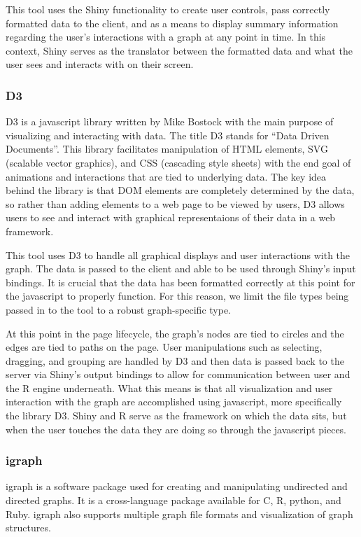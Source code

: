 \documentclass{article}\usepackage{graphicx, color}
\begin{document}
This tool uses the Shiny functionality to create user controls, pass correctly formatted data to the client, and as a means to display summary information regarding the user's interactions with a graph at any point in time. In this context, Shiny serves as the translator between the formatted data and what the user sees and interacts with on their screen.


\subsubsection{D3}
D3 is a javascript library written by Mike Bostock with the main purpose of visualizing and interacting with data.\cite{mb-d3} The title D3 stands for ``Data Driven Documents”. This library facilitates manipulation of HTML elements, SVG (scalable vector graphics), and CSS (cascading style sheets) with the end goal of animations and interactions that are tied to underlying data. The key idea behind the library is that DOM elements are completely determined by the data, so rather than adding elements to a web page to be viewed by users, D3 allows users to see and interact with graphical representaions of their data in a web framework. 

This tool uses D3 to handle all graphical displays and user interactions with the graph. The data is passed to the client and able to be used through Shiny's input bindings. It is crucial that the data has been formatted correctly at this point for the javascript to properly function. For this reason, we limit the file types being passed in to the tool to a robust graph-specific type.

At this point in the page lifecycle, the graph's nodes are tied to circles and the edges are tied to paths on the page. User manipulations such as selecting, dragging, and grouping are handled by D3 and then data is passed back to the server via Shiny's output bindings to allow for communication between user and the R engine underneath. What this means is that all visualization and user interaction with the graph are accomplished using javascript, more specifically the library D3. Shiny and R serve as the framework on which the data sits, but when the user touches the data they are doing so through the javascript pieces.


\subsubsection{igraph}
igraph is a software package used for creating and manipulating undirected and directed graphs. \cite{gc-igraph}It is a cross-language package available for C, R, python, and Ruby. igraph also supports multiple graph file formats and visualization of graph structures.
\end{document}
